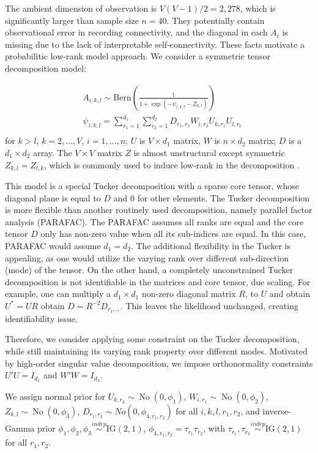 \documentclass[10pt]{article}
\DeclareMathOperator{\No}{No}
\DeclareMathOperator{\1}{\mathbbm{1}}
\begin{document}
The ambient dimension of observation is $V(V-1)/2=2,278$, which is significantly larger than sample size $n=40$. They potentially contain observational error in recording connectivity, and the  diagonal in each $A_{i}$ is missing due to the lack of interpretable self-connectivity. These facts motivate a probabilitic low-rank model approach. We consider a symmetric tensor decomposition model:

\begin{equation*}
\begin{aligned}
& A_{i,k,l} \sim \text{Bern}( \frac{1}{1+ \exp(-\psi_{i,k,l}- Z_{k,l})})\\
& \psi_{i,k,l} = \sum_{r_1=1}^{d_1}\sum_{r_2=1}^{d_2} D_{r_1,r_2} W_{i,r_2} U_{k,r_1} U_{l,r_1}  \\
\end{aligned}
\end{equation*}
for $k>l$, $k=2,\ldots, V$, $i=1,\ldots,n$; $U$ is $V\times d_1$ matrix, $W$ is $n\times d_2$ matrix; $D$ is a $d_1\times d_2$ array. The  $V\times V$ matrix $Z$ is almost unstructural except symmetric $Z_{k,l}=Z_{l,k}$, which is commonly used to induce low-rank in the decomposition \citep{durante2016nonparametric}.


This model is a special Tucker decomposition with a sparse core tensor, whose diagonal plane is equal to $D$ and $0$ for other elements. The Tucker decomposition is more flexible than another routinely used decomposition, namely parallel factor analysis (PARAFAC). The PARAFAC assumes all ranks are equal and the core tensor $D$ only has non-zero value when all its sub-indices are equal. In this case, PARAFAC would assume $d_1=d_2$. The additional flexibility in the Tucker is appealing, as one would utilize the varying rank over different sub-direction (mode) of the tensor. On the other hand, a completely unconstrained Tucker decomposition is not identifiable in the matrices and core tensor, due scaling. For example, one can multiply a $d_1\times d_1$ non-zero diagonal matrix $R$, to $U$ and obtain $U^*=UR$ obtain $D=R^{-2}D_{r_1,.,}$. This leaves the likelihood unchanged, creating identifiability issue. 

Therefore, we consider applying some constraint on the Tucker decomposition, while still maintaining its varying rank property over different modes. Motivated by high-order singular value decomposition, we impose orthonormality constraints $U'U=I_{d_1}$ and $W'W=I_{d_2}$.

We assign normal prior for $U_{k,r_2}\sim \No(0,\phi_{1})$, $W_{i,r_1}\sim \No(0,\phi_2)$, $Z_{k,l}\sim \No(0,\phi_3)$, $D_{r_1,r_2}\sim No(0, \phi_{4,r_1,r_2})$ for all $i,k,l,r_1,r_2$, and inverse-Gamma prior $\phi_1,\phi_2,\phi_3\stackrel{indep}{\sim} \text{IG}(2,1)$, $\phi_{4,r_1,r_2}= \tau_{r_1}\tau_{r_2}$, with $\tau_{r_1},\tau_{r_2}\stackrel{indep}{\sim} \text{IG}(2,1)$ for all $r_1,r_2$.
\end{document}
